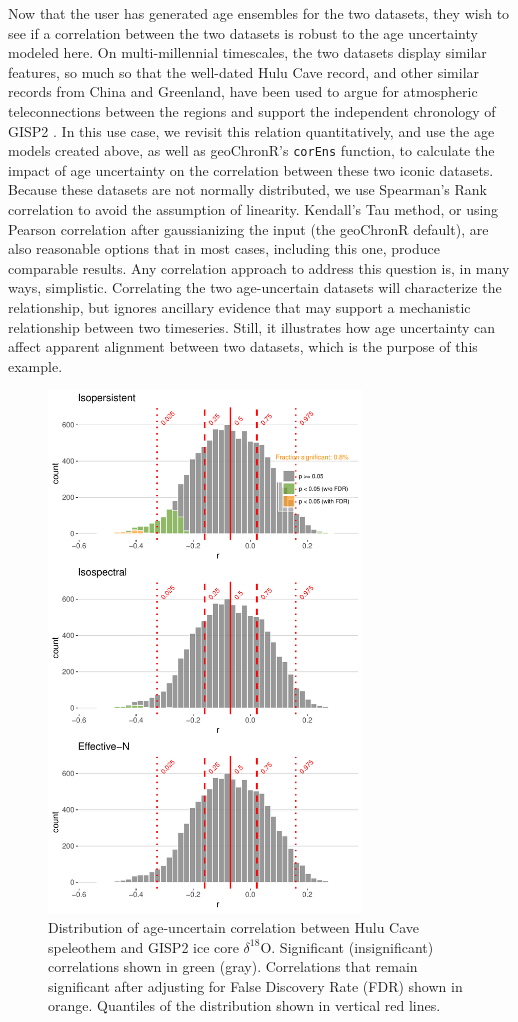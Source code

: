 \documentclass[gchron, manuscript]{copernicus}
\begin{document}
Now that the user has generated age ensembles for the two datasets, they
wish to see if a correlation between the two datasets is robust to the
age uncertainty modeled here. On multi-millennial timescales, the two
datasets display similar features, so much so that the well-dated Hulu
Cave record, and other similar records from China and Greenland, have
been used to argue for atmospheric teleconnections between the regions
and support the independent chronology of GISP2 \citep{hulu2001}. In
this use case, we revisit this relation quantitatively, and use the age
models created above, as well as geoChronR's \texttt{corEns} function,
to calculate the impact of age uncertainty on the correlation between
these two iconic datasets. Because these datasets are not normally
distributed, we use Spearman's Rank correlation to avoid the assumption
of linearity. Kendall's Tau method, or using Pearson correlation after
gaussianizing the input (the geoChronR default), are also reasonable
options that in most cases, including this one, produce comparable
results. Any correlation approach to address this question is, in many
ways, simplistic. Correlating the two age-uncertain datasets will
characterize the relationship, but ignores ancillary evidence that may
support a mechanistic relationship between two timeseries. Still, it
illustrates how age uncertainty can affect apparent alignment between
two datasets, which is the purpose of this example.

\begin{figure}
\includegraphics[width=8.3cm]{geoChronR-paper_files/figure-latex/cor-hist-1} \caption{Distribution of age-uncertain correlation between Hulu Cave speleothem and GISP2 ice core $\delta^{18}$O. Significant (insignificant) correlations shown in green (gray). Correlations that remain significant after adjusting for False Discovery Rate (FDR) shown in orange. Quantiles of the distribution shown in vertical red lines.}\label{fig:cor-hist}
\end{figure}
\end{document}
